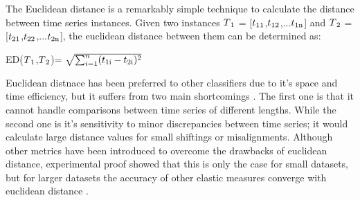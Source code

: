 The Euclidean distance is a remarkably simple technique to calculate the distance between time series instances.
Given two instances  $T\textsubscript{1}$ = [$t\textsubscript{11}$,$t\textsubscript{12}$,...$t\textsubscript{1n}$]
and $T\textsubscript{2}$ = [$t\textsubscript{21}$,$t\textsubscript{22}$,...$t\textsubscript{2n}$], the euclidean distance
between them can be determined as:
\begin{definition}
    ED($T\textsubscript{1}$,$T\textsubscript{2}$)= $\sqrt{\sum_{i=1}^{n} (t\textsubscript{1i} - t\textsubscript{2i})^{2}}$
\end{definition}
Euclidean distnace has been preferred to other classifiers due to it's space and time efficiency, but it suffers from two main shortcomings \cite{baydogan2013bag, jeong2011weighted,kate2016using}.
The first one is that it cannot handle comparisons between time series of different lengths.
While the second one is it's sensitivity to minor discrepancies between time series; it would calculate large distance values for small shiftings or misalignments.
Although other metrics have been introduced to overcome the drawbacks of euclidean distance,
experimental proof showed that this is only the case for small datasets, but for larger datasets the accuracy of other elastic measures
converge with euclidean distance \cite{hills2014classification,ding2008querying,bagnall2012transformation}.